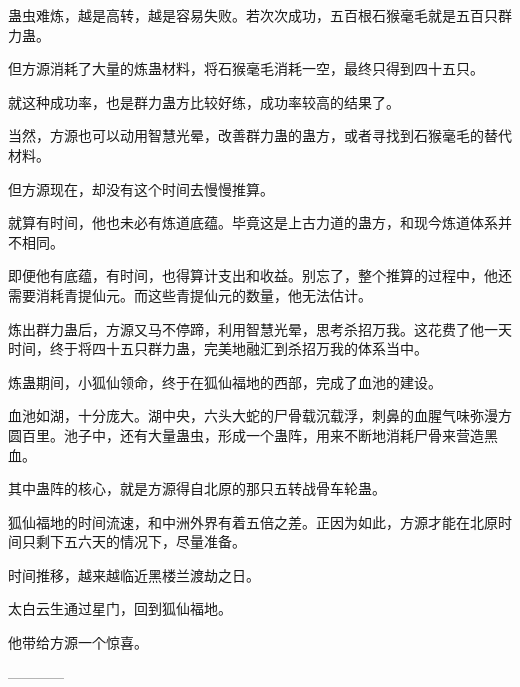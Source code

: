 \begin{this_body}
蛊虫难炼，越是高转，越是容易失败。若次次成功，五百根石猴毫毛就是五百只群力蛊。

但方源消耗了大量的炼蛊材料，将石猴毫毛消耗一空，最终只得到四十五只。

就这种成功率，也是群力蛊方比较好练，成功率较高的结果了。

当然，方源也可以动用智慧光晕，改善群力蛊的蛊方，或者寻找到石猴毫毛的替代材料。

但方源现在，却没有这个时间去慢慢推算。

就算有时间，他也未必有炼道底蕴。毕竟这是上古力道的蛊方，和现今炼道体系并不相同。

即便他有底蕴，有时间，也得算计支出和收益。别忘了，整个推算的过程中，他还需要消耗青提仙元。而这些青提仙元的数量，他无法估计。

炼出群力蛊后，方源又马不停蹄，利用智慧光晕，思考杀招万我。这花费了他一天时间，终于将四十五只群力蛊，完美地融汇到杀招万我的体系当中。

炼蛊期间，小狐仙领命，终于在狐仙福地的西部，完成了血池的建设。

血池如湖，十分庞大。湖中央，六头大蛇的尸骨载沉载浮，刺鼻的血腥气味弥漫方圆百里。池子中，还有大量蛊虫，形成一个蛊阵，用来不断地消耗尸骨来营造黑血。

其中蛊阵的核心，就是方源得自北原的那只五转战骨车轮蛊。

狐仙福地的时间流速，和中洲外界有着五倍之差。正因为如此，方源才能在北原时间只剩下五六天的情况下，尽量准备。

时间推移，越来越临近黑楼兰渡劫之日。

太白云生通过星门，回到狐仙福地。

他带给方源一个惊喜。

------------

\end{this_body}

